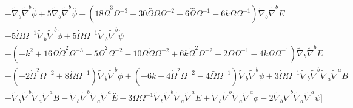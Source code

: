 \documentclass[10pt,letterpaper]{article}
\numberwithin{equation}{section}
\begin{document}
\begin{eqnarray}
&& -  \tilde{\nabla}_{b}\tilde{\nabla}^{b}\overset{..}{\phi} + 5 \tilde{\nabla}_{b}\tilde{\nabla}^{b}\overset{..}{\psi} + (18 \dot{\Omega}^3 \Omega^{-3} - 30 \overset{..}{\Omega} \dot{\Omega} \Omega^{-2} + 6 \overset{...}{\Omega} \Omega^{-1} - 6 k \dot{\Omega} \Omega^{-1}) \tilde{\nabla}_{b}\tilde{\nabla}^{b}\dot{E} \nonumber \\ 
&& + 5 \dot{\Omega} \Omega^{-1} \tilde{\nabla}_{b}\tilde{\nabla}^{b}\dot{\phi} + 5 \dot{\Omega} \Omega^{-1} \tilde{\nabla}_{b}\tilde{\nabla}^{b}\dot{\psi} \nonumber \\ 
&& + (- k^2 + 16 \overset{..}{\Omega} \dot{\Omega}^2 \Omega^{-3} - 5 \overset{..}{\Omega}^2 \Omega^{-2} - 10 \overset{...}{\Omega} \dot{\Omega} \Omega^{-2} + 6 k \dot{\Omega}^2 \Omega^{-2} + 2 \overset{....}{\Omega} \Omega^{-1} - 4 k \overset{..}{\Omega} \Omega^{-1}) \tilde{\nabla}_{b}\tilde{\nabla}^{b}E \nonumber \\ 
&& + (-2 \dot{\Omega}^2 \Omega^{-2} + 8 \overset{..}{\Omega} \Omega^{-1}) \tilde{\nabla}_{b}\tilde{\nabla}^{b}\phi + (-6 k + 4 \dot{\Omega}^2 \Omega^{-2} - 4 \overset{..}{\Omega} \Omega^{-1}) \tilde{\nabla}_{b}\tilde{\nabla}^{b}\psi + 3 \dot{\Omega} \Omega^{-1} \tilde{\nabla}_{b}\tilde{\nabla}^{b}\tilde{\nabla}_{a}\tilde{\nabla}^{a}B \nonumber \\ 
&& + \tilde{\nabla}_{b}\tilde{\nabla}^{b}\tilde{\nabla}_{a}\tilde{\nabla}^{a}\dot{B} -  \tilde{\nabla}_{b}\tilde{\nabla}^{b}\tilde{\nabla}_{a}\tilde{\nabla}^{a}\overset{..}{E} - 3 \dot{\Omega} \Omega^{-1} \tilde{\nabla}_{b}\tilde{\nabla}^{b}\tilde{\nabla}_{a}\tilde{\nabla}^{a}\dot{E} + \tilde{\nabla}_{b}\tilde{\nabla}^{b}\tilde{\nabla}_{a}\tilde{\nabla}^{a}\phi - 2 \tilde{\nabla}_{b}\tilde{\nabla}^{b}\tilde{\nabla}_{a}\tilde{\nabla}^{a}\psi \Bigg]
\label{dw1tr}
\end{eqnarray}
\end{document}
